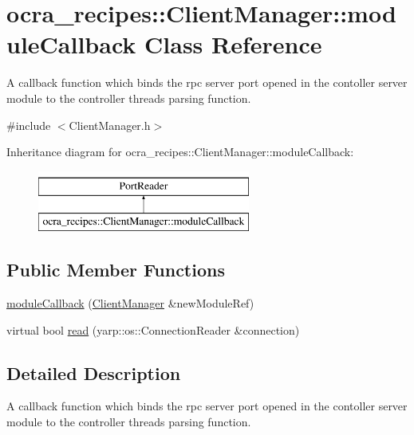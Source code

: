 \hypertarget{classocra__recipes_1_1ClientManager_1_1moduleCallback}{}\section{ocra\+\_\+recipes\+:\+:Client\+Manager\+:\+:module\+Callback Class Reference}
\label{classocra__recipes_1_1ClientManager_1_1moduleCallback}


A callback function which binds the rpc server port opened in the contoller server module to the controller thread\textquotesingle{}s parsing function.  




{\ttfamily \#include $<$Client\+Manager.\+h$>$}

Inheritance diagram for ocra\+\_\+recipes\+:\+:Client\+Manager\+:\+:module\+Callback\+:\begin{figure}[H]
\begin{center}
\leavevmode
\includegraphics[height=2.000000cm]{d4/d05/classocra__recipes_1_1ClientManager_1_1moduleCallback}
\end{center}
\end{figure}
\subsection*{Public Member Functions}
\begin{DoxyCompactItemize}
\item 
\hyperlink{classocra__recipes_1_1ClientManager_1_1moduleCallback_a9c5241da8148f501d1947053fe06ebdb}{module\+Callback} (\hyperlink{classocra__recipes_1_1ClientManager}{Client\+Manager} \&new\+Module\+Ref)
\item 
virtual bool \hyperlink{classocra__recipes_1_1ClientManager_1_1moduleCallback_a728d0037e1552bf3ca6152d6b638f30c}{read} (yarp\+::os\+::\+Connection\+Reader \&connection)
\end{DoxyCompactItemize}


\subsection{Detailed Description}
A callback function which binds the rpc server port opened in the contoller server module to the controller thread\textquotesingle{}s parsing function. 

